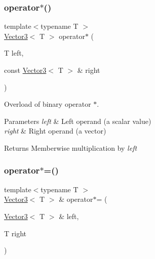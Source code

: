 \subsubsection{\texorpdfstring{operator$\ast$()}{operator*()}\hspace{0.1cm}{\footnotesize\ttfamily [2/2]}}
{\footnotesize\ttfamily template$<$typename T $>$ \\
\mbox{\hyperlink{classsf_1_1_vector3}{Vector3}}$<$ T $>$ operator$\ast$ (\begin{DoxyParamCaption}\item[{T}]{left,  }\item[{const \mbox{\hyperlink{classsf_1_1_vector3}{Vector3}}$<$ T $>$ \&}]{right }\end{DoxyParamCaption})\hspace{0.3cm}{\ttfamily [related]}}



Overload of binary operator $\ast$. 


\begin{DoxyParams}{Parameters}
{\em left} & Left operand (a scalar value) \\
\hline
{\em right} & Right operand (a vector)\\
\hline
\end{DoxyParams}
\begin{DoxyReturn}{Returns}
Memberwise multiplication by {\itshape left} \begin{DoxyVerb}\end{DoxyVerb}
 
\end{DoxyReturn}
\mbox{\label{classsf_1_1_vector3_ad5fb972775ce8ab58cd9670789e806a7}} 
\subsubsection{\texorpdfstring{operator$\ast$=()}{operator*=()}}
{\footnotesize\ttfamily template$<$typename T $>$ \\
\mbox{\hyperlink{classsf_1_1_vector3}{Vector3}}$<$ T $>$ \& operator$\ast$= (\begin{DoxyParamCaption}\item[{\mbox{\hyperlink{classsf_1_1_vector3}{Vector3}}$<$ T $>$ \&}]{left,  }\item[{T}]{right }\end{DoxyParamCaption})\hspace{0.3cm}{\ttfamily [related]}}



